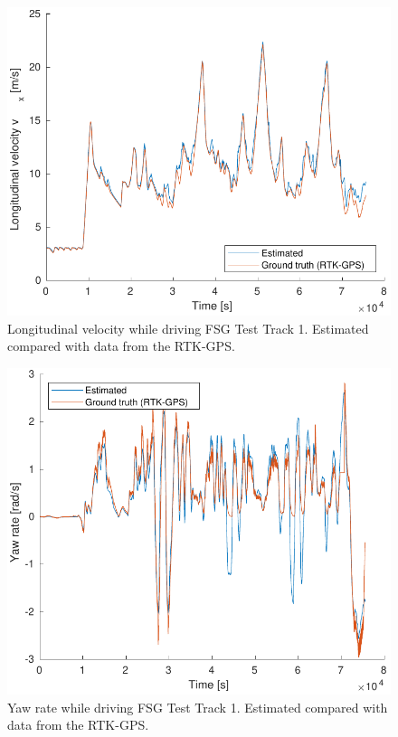 \begin{figure}
    \centering
    \includegraphics[width=0.8\linewidth]{0_Images/6_Results/vxFSGTestTrack.pdf}
    \caption[Longitudinal velocity while driving FSG Test Track 1.]
    {Longitudinal velocity while driving FSG Test Track 1. Estimated compared with data from the RTK-GPS.}
    \label{Fig:VxFSGTestTrack}
\end{figure}

\begin{figure}
    \centering
    \includegraphics[width=0.8\linewidth]{0_Images/6_Results/rFSGTestTrack.pdf}
    \caption[Yaw rate while driving FSG Test Track 1.]
    {Yaw rate while driving FSG Test Track 1. Estimated compared with data from the RTK-GPS.}
    \label{Fig:RFSGTestTrack}
\end{figure}

